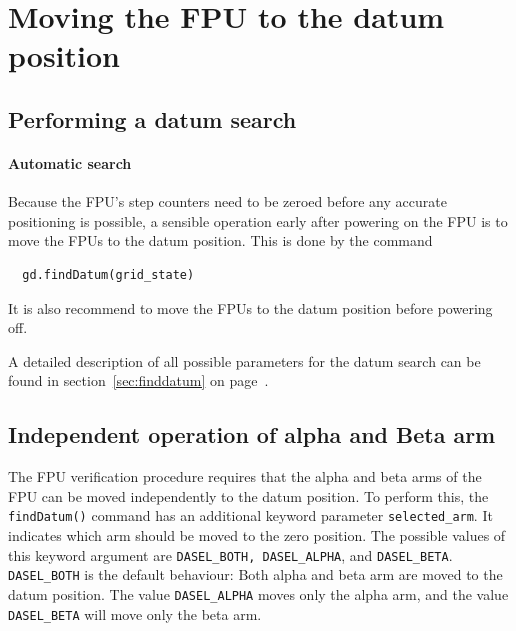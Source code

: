 \documentclass[fontsize=12,a4paper]{scrreprt}
\begin{document}
\section{Moving the FPU to the datum position}
\label{sec:finddatumreference}
\subsection{Performing a datum search}

\paragraph{Automatic search}

Because the FPU's step counters need to be zeroed
before any accurate positioning is possible, a
sensible operation early after powering on
the FPU is to move the FPUs to the datum position.
This is done by the command

\begin{verbatim}
  gd.findDatum(grid_state)
\end{verbatim}

It is also recommend to move the FPUs to the datum position
before powering off.

A detailed description of all possible
parameters for the datum search can be found in
section~\ref{sec:finddatum} on page~\pageref{sec:finddatum}.


\subsection{Independent operation of alpha and Beta arm}

The FPU verification procedure requires that the alpha and beta arms
of the FPU can be moved independently to the datum position.  To
perform this, the \texttt{findDatum()} command has an additional
keyword parameter \texttt{selected\_arm}. It indicates which arm
should be moved to the zero position. The possible values of this
keyword argument are \texttt{DASEL\_BOTH, DASEL\_ALPHA}, and
\texttt{DASEL\_BETA}.  \texttt{DASEL\_BOTH} is the default behaviour:
Both alpha and beta arm are moved to the datum position. The value
\texttt{DASEL\_ALPHA} moves only the alpha arm, and the value
\texttt{DASEL\_BETA} will move only the beta arm.
\end{document}
